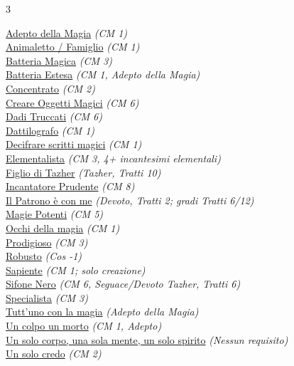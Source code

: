 \begin{multicols}{3}
{\begin{flushleft}
\hyperlink{Adepto della Magia}{Adepto della Magia} \textit{(CM 1)}\\
\hyperlink{Animaletto / Famiglio}{Animaletto / Famiglio} \textit{(CM 1)}\\
\hyperlink{Batteria Magica}{Batteria Magica} \textit{(CM 3)}\\
\hyperlink{Batteria Estesa}{Batteria Estesa} \textit{(CM 1, Adepto della Magia)}\\
\hyperlink{Concentrato}{Concentrato} \textit{(CM 2)}\\
\hyperlink{Creare Oggetti Magici}{Creare Oggetti Magici} \textit{(CM 6)}\\
\hyperlink{Dadi Truccati}{Dadi Truccati} \textit{(CM 6)}\\
\hyperlink{Dattilografo}{Dattilografo} \textit{(CM 1)}\\
\hyperlink{Decifrare scritti magici}{Decifrare scritti magici} \textit{(CM 1)}\\
\hyperlink{Elementalista}{Elementalista} \textit{(CM 3, 4+ incantesimi elementali)}\\
\hyperlink{Figlio di Tazher}{Figlio di Tazher} \textit{(Tazher, Tratti 10)}\\
\hyperlink{Incantatore Prudente}{Incantatore Prudente} \textit{(CM 8)}\\
\hyperlink{Il Patrono è con me}{Il Patrono è con me} \textit{(Devoto, Tratti 2; gradi Tratti 6/12)}\\
\hyperlink{Magie Potenti}{Magie Potenti} \textit{(CM 5)}\\
\hyperlink{Occhi della magia}{Occhi della magia} \textit{(CM 1)}\\
\hyperlink{Prodigioso}{Prodigioso} \textit{(CM 3)}\\
\hyperlink{Robusto}{Robusto} \textit{(Cos -1)}\\
\hyperlink{Sapiente}{Sapiente} \textit{(CM 1; solo creazione)}\\
\hyperlink{Sifone Nero}{Sifone Nero} \textit{(CM 6, Seguace/Devoto Tazher, Tratti 6)}\\
\hyperlink{Specialista}{Specialista} \textit{(CM 3)}\\
\hyperlink{Tutt'uno con la magia}{Tutt'uno con la magia} \textit{(Adepto della Magia)}\\
\hyperlink{Un colpo un morto}{Un colpo un morto} \textit{(CM 1, Adepto)}\\
\hyperlink{Un solo corpo, una sola mente, un solo spirito}{Un solo corpo, una sola mente, un solo spirito} \textit{(Nessun requisito)}\\
\hyperlink{Un solo credo}{Un solo credo} \textit{(CM 2)}\\


\end{flushleft}}
\end{multicols}
